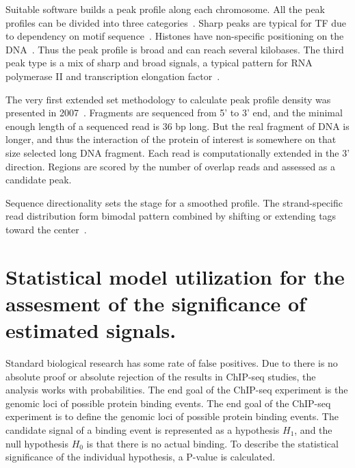 Suitable software builds a peak profile along each chromosome. 
All the peak profiles can be divided into three categories~\cite{park2009chip}. 
Sharp peaks are typical for TF due to dependency on motif sequence~\cite{landt2012chip}. 
Histones have non-specific positioning on the DNA~\cite{krig2007identification}. 
Thus the peak profile is broad and can reach several kilobases. 
The third peak type is a mix of sharp and broad signals, a typical pattern for RNA polymerase II and transcription elongation factor~\cite{squazzo2006suz12, lin2011dynamic}.



The very first extended set methodology to calculate peak profile density was presented in 2007~\cite{robertson2007genome}. 
Fragments are sequenced from 5' to 3' end, and the minimal enough length of a sequenced read is 36 bp long. 
But the real fragment of DNA is longer, and thus the interaction of the protein of interest is somewhere on that size selected long DNA fragment. 
Each read is computationally extended in the 3' direction. 
Regions are scored by the number of overlap reads and assessed as a candidate peak.



Sequence directionality sets the stage for a smoothed profile. 
The strand-specific read distribution form bimodal pattern combined by shifting or extending tags toward the center~\cite{valouev2008genome}.

\section{Statistical model utilization for the assesment of the significance of estimated signals.}


Standard biological research has some rate of false positives. 
Due to there is no absolute proof or absolute rejection of the results in ChIP-seq studies, the analysis works with probabilities.
The end goal of the ChIP-seq experiment is the genomic loci of possible protein binding events. 
The end goal of the ChIP-seq experiment is to define the genomic loci of possible protein binding events. 
The candidate signal of a binding event is represented as a hypothesis $H_{1}$, and the null hypothesis $H_{0}$ is that there is no actual binding. To describe the statistical significance of the individual hypothesis, a P-value is calculated. 

